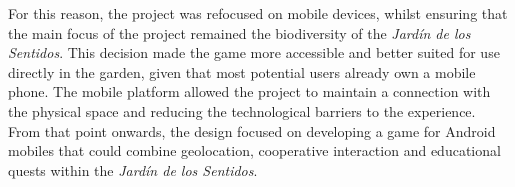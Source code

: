 For this reason, the project was refocused on mobile devices, whilst ensuring that the main focus of the project remained the biodiversity of the \textit{Jardín de los Sentidos}. This decision made the game more accessible and better suited for use directly in the garden, given that most potential users already own a mobile phone. The mobile platform allowed the project to maintain a connection with the physical space and reducing the technological barriers to the experience. From that point onwards, the design focused on developing a game for Android mobiles that could combine geolocation, cooperative interaction and educational quests within the \textit{Jardín de los Sentidos}.

